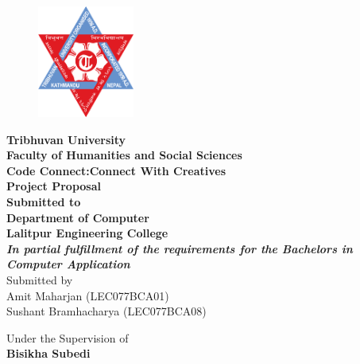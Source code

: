 \documentclass{report}
\begin{document}
\begin{figure}
    \centering
    \includegraphics[width=1.25in]{tu.png}
\end{figure}
\begin{center}
    {\fontsize{14pt}{18}\selectfont
    \textbf{Tribhuvan University\\
    Faculty of Humanities and Social Sciences\\
    \vspace{0.5in}
    Code Connect:Connect With Creatives\\
    \vspace{0.5in}
    Project Proposal\\
    \vspace{0.75in}
    Submitted to\\
    Department of Computer\\
    Lalitpur Engineering College\\
    \vspace{0.75in}
    \textit{In partial fulfillment of the requirements for the Bachelors in Computer Application}
    }\\
    \vspace{0.25in}
    Submitted by\\
    Amit Maharjan (LEC077BCA01)\\
    Sushant Bramhacharya (LEC077BCA08)\\
    \vspace{0.5in}
    
    Under the Supervision of\\
    \textbf{Bisikha Subedi}
    }
\end{center}
\end{document}
